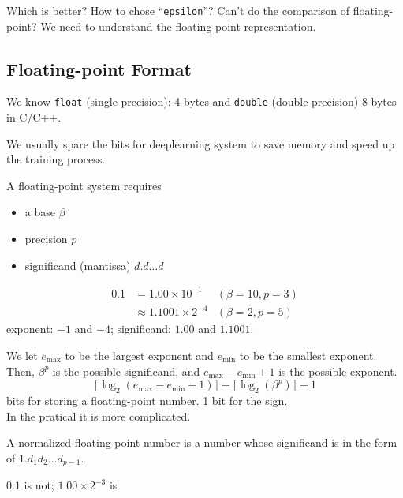 Which is better? How to chose ``\texttt{epsilon}''? Can't do the comparison of floating-point? We need to understand the floating-point representation.

\subsection{Floating-point Format}
We know \texttt{float} (single precision): 4 bytes and \texttt{double} (double precision) 8 bytes in C/C++.

\begin{note}
    We usually spare the bits for deeplearning system to save memory and speed up the training process.
\end{note}

\begin{definition}[format]
    A floating-point system requires 
    \begin{itemize}
        \item a base $\beta$
        \item precision $p$
        \item significand (mantissa) $d.d\ldots d$
    \end{itemize}
\end{definition}

\begin{eg}
    \begin{align*}
        0.1 &= 1.00 \times 10^{-1} &(\beta = 10, p = 3) \\
        &\approx 1.1001 \times 2^{-4} &(\beta = 2, p = 5)
    \end{align*}
    exponent: $-1$ and $-4$; significand: $1.00$ and $1.1001$.
\end{eg}

We let $e_{\max}$ to be the largest exponent and $e_{\min}$ to be the smallest exponent. Then, $\beta^{p}$ is the possible significand, and $e_{\max} - e_{\min} + 1$ is the possible exponent.
\[
    \lceil \log_{2}(e_{\max} - e_{\min} + 1) \rceil + \lceil \log_{2}(\beta^{p}) \rceil + 1
\]
bits for storing a floating-point number. 1 bit for the sign.\\

In the pratical it is more complicated.

\begin{definition}
    A normalized floating-point number is a number whose significand is in the form of $1.d_1d_2\ldots d_{p-1}$.
    \begin{eg}
        $0.1$ is not; $1.00 \times 2^{-3}$ is
    \end{eg}
\end{definition}

